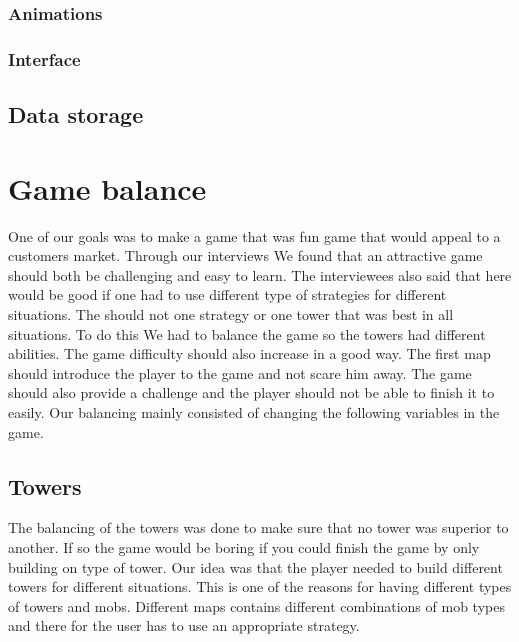 \subsubsection{Animations}

\subsubsection{Interface}

\subsection{Data storage}



\section{Game balance}

One of our goals was to make a game that was fun game that would appeal to a customers market. Through our interviews We found that an attractive game should both be challenging and easy to learn. The interviewees also said that here would be good if one had to use different type of strategies for different situations. The should not one strategy or one tower that was best in all situations. To do this We had to balance the game so the towers had different abilities. The game difficulty should also increase in a good way. The first map should introduce the player to the game and not scare him away. The game should also provide a challenge and the player should not be able to finish it to easily. Our balancing mainly consisted of changing the following variables in the game.
\subsection{Towers}

The balancing of the towers was done to make sure that no tower was superior to another. If so the game would be boring if you could finish the game by only building on type of tower. Our idea was that the player needed to build different towers for different situations. This is one of the reasons for having different types of towers and mobs. Different maps contains different combinations of mob types and there for the user has to use an appropriate strategy.
